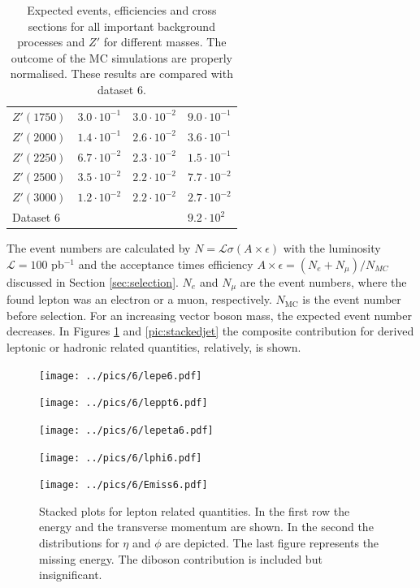 \begin{table}[H]
\begin{tabular}{l|l|l|l}
$Z'(1750)$&$3.0\cdot 10^{-1}$&$3.0\cdot 10^{-2}$ &$9.0\cdot 10^{-1}$\\
$Z'(2000)$&$1.4\cdot 10^{-1}$&$2.6\cdot 10^{-2}$ &$3.6\cdot 10^{-1}$\\
$Z'(2250)$&$6.7\cdot 10^{-2}$&$2.3\cdot 10^{-2}$ &$1.5\cdot 10^{-1}$\\
$Z'(2500)$&$3.5\cdot 10^{-2}$&$2.2\cdot 10^{-2}$ &$7.7\cdot 10^{-2}$\\
$Z'(3000)$&$1.2\cdot 10^{-2}$&$2.2\cdot 10^{-2}$ &$2.7\cdot 10^{-2}$\\
\hline
Dataset 6 & & &$9.2\cdot 10^{2}$
 \end{tabular}
 \caption{\small{Expected events, efficiencies and cross sections for all important background processes and $Z'$ for different masses. The outcome of the MC
 simulations are properly normalised. These results are compared with dataset 6.}}
 \label{tab:expEvents}
\end{table}
The event numbers are calculated by $N=\mathcal{L}\sigma (A\times \epsilon)$ with the luminosity $\mathcal{L}=100$ pb$^{-1}$ and the acceptance times
efficiency $A\times\epsilon = (N_e+N_\mu)/N_{MC}$ discussed in Section \ref{sec:selection}. $N_e$ and $N_\mu$ are the event numbers, where the found
lepton was an electron or a muon, respectively. $N_\text{MC}$ is the event number before selection.
For an increasing vector boson mass, the expected event number decreases. 
In Figures \ref{pic:stackedlep} and \ref{pic:stackedjet} the composite contribution for derived leptonic or hadronic
related quantities, relatively, is shown. 
\begin{figure}[H]
\begin{minipage}{\minwidththree\textwidth}
 \texttt{[image: ../pics/6/lepe6.pdf]}
\end{minipage}
\begin{minipage}{\minwidththree\textwidth}
 \texttt{[image: ../pics/6/leppt6.pdf]}
\end{minipage}

\begin{minipage}{\minwidththree\textwidth}
 \texttt{[image: ../pics/6/lepeta6.pdf]}
\end{minipage}
\begin{minipage}{\minwidththree\textwidth}
 \texttt{[image: ../pics/6/lphi6.pdf]}
\end{minipage}

\begin{minipage}{\minwidththree\textwidth}
 \texttt{[image: ../pics/6/Emiss6.pdf]}
\end{minipage}
\caption{\small{Stacked plots for lepton related quantities. In the first row the energy and the transverse momentum are shown. In the second the distributions
for $\eta$ and $\phi$ are depicted. The last figure represents the missing energy. The diboson contribution is included but insignificant.}}
\label{pic:stackedlep}
 
\end{figure}


